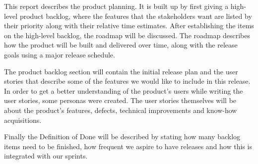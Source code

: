 This report describes the product planning. It is built up by first giving a high-level product backlog, where the features that the stakeholders want are listed by their priority along with their relative time estimates. After establishing the items on the high-level backlog, the roadmap will be discussed. The roadmap describes how the product will be built and delivered over time, along with the release goals using a major release schedule.

The product backlog section will contain the initial release plan and the user stories that describe some of the features we would like to include in this release. In order to get a better understanding of the product's users while writing the user stories, some personas were created. The user stories themselves will be about the product's features, defects, technical improvements and know-how acquisitions.

Finally the Definition of Done will be described by stating how many backlog items need to be finished, how frequent we aspire to have releases and how this is integrated with our sprints.

